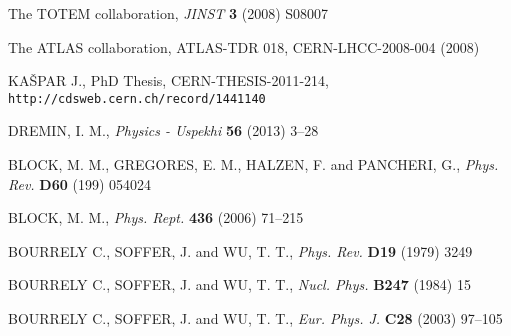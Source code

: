 \documentclass[preprint,12pt]{elsarticle}
\begin{document}




\begin{thebibliography}{00}

\def\Name#1{#1, }
\def\REVIEW#1#2#3#4{{\it #1} {\bf #2} (#3) #4}
	
	\Name{The TOTEM collaboration}
	\REVIEW{JINST}{3}{2008}{S08007}

	\Name{The ATLAS collaboration}
	ATLAS-TDR 018, CERN-LHCC-2008-004 (2008)

    \Name{KA\v SPAR J.}
    PhD Thesis, CERN-THESIS-2011-214, {\tt http://cdsweb.cern.ch/record/1441140}

	\Name{DREMIN, I. M.}
	\REVIEW{Physics - Uspekhi}{56}{2013}{3--28}

	\Name{BLOCK, M. M., GREGORES, E. M., HALZEN, F. and PANCHERI, G.}
	\REVIEW{Phys. Rev.}{D60}{199}{054024}

	\Name{BLOCK, M. M.}
	\REVIEW{Phys. Rept.}{436}{2006}{71--215}


	\Name{BOURRELY C., SOFFER, J. and WU, T. T.}
	\REVIEW{Phys. Rev.}{D19}{1979}{3249}

	\Name{BOURRELY C., SOFFER, J. and WU, T. T.}
	\REVIEW{Nucl. Phys.}{B247}{1984}{15}

	\Name{BOURRELY C., SOFFER, J. and WU, T. T.}
	\REVIEW{Eur. Phys. J.}{C28}{2003}{97--105}


\end{thebibliography}
\end{document}
